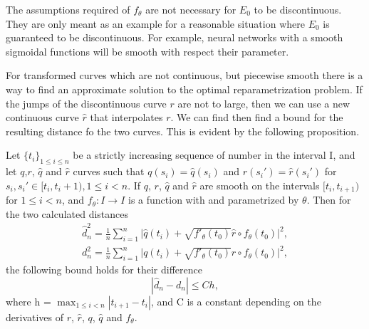 The assumptions required of  \(f_{\theta}\) are not necessary for  \(E_0\) to be discontinuous. They are only meant as an example for a reasonable situation where  \(E_0\) is guaranteed to be discontinuous. For example, neural networks with a smooth sigmoidal functions will be smooth with respect their parameter.

For transformed curves which are not continuous, but piecewise smooth there is a way to find an approximate solution to the optimal reparametrization problem. If the jumps of the discontinuous curve \(r\) are not to large, then we can use a new continuous curve \(\hat r\) that interpolates \(r\). We can find then find a bound for the resulting distance fo the two curves. This is evident by the following proposition.
\begin{proposition}
  Let \(\{t_i\}_{1 \leq i\leq n}\) be a strictly increasing sequence of number in the interval I, and let \(q\),\(r\), \(\hat q\) and  \(\hat r\) curves such that \(q(s_i)=\hat q(s_i)\) and \(r(s_i')=\hat r(s_i')\) for \(s_i, s_i' \in [t_i, t_i+1), 1\leq i < n\). If  \(q\),  \(r\),   \(\hat q\) and  \(\hat r\) are smooth on the intervals  \([t_i, t_{i+1})\) for  \( 1 \leq i <n\), and  \(f_\theta : I \rightarrow I\) is a function with  and parametrized by \( \theta \). Then for the two calculated distances
  \begin{eqnarray}
    \hat d_n^2=\frac{1}{n}\sum_{i=1}^{n}\Big|\hat q(t_i) + \sqrt{f'_{\theta}(t_0)} \hat r \circ f_{\theta}(t_0)\Big|^2, \\
    d_n^2=\frac{1}{n}\sum_{i=1}^{n}\Big|q(t_i) + \sqrt{f'_{\theta}(t_0)} r \circ f_{\theta}(t_0)\Big|^2,
  \end{eqnarray}
  the following bound holds for their difference
  \begin{equation}
    | \hat d_n -d_n | \leq  C h,
  \end{equation}
  where h = \(\max_{1\leq i<n}|t_{i+1} - t_{i} |\), and C is a constant depending on the derivatives of  \(r\),  \(\hat{r}\),  \(q\),  \(\hat q\) and  \(f_{\theta}\).
\end{proposition}
